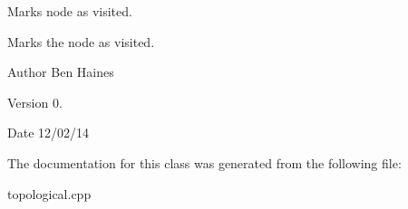 Marks node as visited. 

Marks the node as visited. \begin{DoxyAuthor}{Author}
Ben Haines 
\end{DoxyAuthor}
\begin{DoxyVersion}{Version}
0. 
\end{DoxyVersion}
\begin{DoxyDate}{Date}
12/02/14 
\end{DoxyDate}


The documentation for this class was generated from the following file\+:\begin{DoxyCompactItemize}
\item 
topological.\+cpp\end{DoxyCompactItemize}
